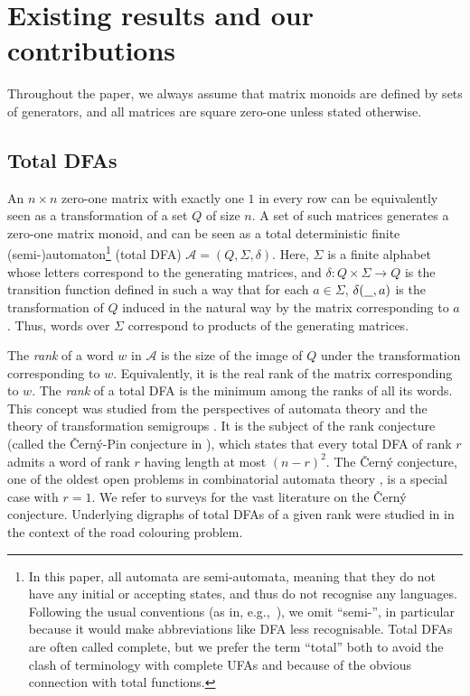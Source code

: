 \documentclass[11pt,a4paper]{amsart}
\newcommand{\Aa}{\mathcal{A}}
\theoremstyle{plain}
\theoremstyle{definition}
\theoremstyle{defC}
\theoremstyle{thmC}
\theoremstyle{plain}
\numberwithin{equation}{section}
\begin{document}
\section{Existing results and our contributions}\label{sec-existing}

Throughout the paper, we always assume that matrix monoids are defined by sets of generators, and 
all matrices are square zero-one unless stated otherwise.

\subsection{Total DFAs}

An $n \times n$ zero-one matrix with exactly one $1$ in every row can be equivalently seen as a transformation of a set $Q$ of size $n$. A set of such matrices generates a zero-one matrix monoid, and can be seen as a total deterministic finite (semi-)automaton\footnote{\label{footnote-semi}In this paper, all automata are semi-automata, meaning that they do not have any initial or accepting states, and thus do not recognise any languages. Following the usual conventions (as in, e.g.,~\cite{Berstel2010}), we omit ``semi-'', in particular because it would make abbreviations like DFA less recognisable. Total DFAs are often called complete, but we prefer the
term “total” both to avoid the clash of terminology with complete UFAs and because of the obvious connection
with total functions.} (total DFA) $\Aa = (Q, \Sigma, \delta)$. Here, $\Sigma$ is a finite alphabet whose letters correspond to the generating matrices, and $\delta: Q \times \Sigma \to Q$ is the transition function defined in such a way that for each $a \in \Sigma$, $\delta(\underline{\hspace{0.25cm}}, a)$ is the transformation of $Q$ induced in the natural way by the matrix corresponding to $a$. Thus, words over $\Sigma$ correspond to products of the generating matrices.

The \emph{rank} of a word $w$ in $\Aa$ is the size of the image of $Q$ under the transformation corresponding to $w$. Equivalently, it is the real rank of the matrix corresponding to $w$.
The \emph{rank} of a total DFA is the minimum among the ranks of all its words. This concept was studied from the perspectives of automata theory \cite{Rystsov1992Rank,Kari2019} and the theory of transformation semigroups \cite{Shin2010Rank,Karimi2017MinIdeal}. It is the subject of the rank conjecture (called the \v{C}ern\'{y}-Pin conjecture in \cite{Rystsov1992Rank}), which states that every total DFA of rank $r$ admits a word of rank $r$ having length at most $(n - r)^2$. The \v{C}ern\'{y} conjecture, one of the oldest open problems in combinatorial automata theory \cite{Volkov2022}, is a special case with $r = 1$. We refer to surveys \cite{Volkov2008,Beal2016,Kari2019,Volkov2022} for the vast literature on the \v{C}ern\'{y} conjecture. Underlying digraphs of total DFAs of a given rank were studied in \cite{Budzban2011Generalized,Beal2016} in the context of the road colouring problem.
\end{document}
